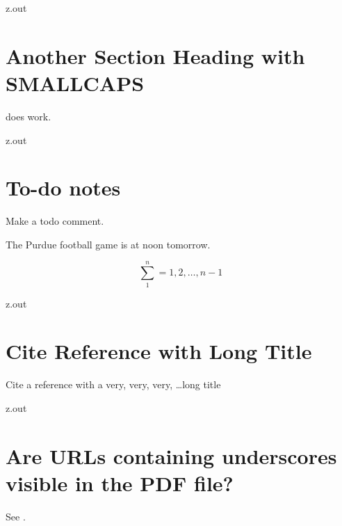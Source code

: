 \MyIO


\begin{VerbatimOut}{z.out}


\section
  [Another Section Heading with {\protect\scshape SmallCaps}]%
  {Another Section Heading with S{\protect\scriptsize MALL}C{\protect\scriptsize APS}}

does work.
\end{VerbatimOut}

\MyIO


\begin{VerbatimOut}{z.out}


\section{To-do notes}

Make a todo comment.%

The Purdue football game is at noon tomorrow.%

\[
  \sum_1^n = 1, 2, \ldots, n - 1
\]%
\end{VerbatimOut}

\MyIO


\begin{VerbatimOut}{z.out}


\section{Cite Reference with Long Title}
  
Cite a reference with a very, very, very, \ldots long title
\cite{test-long-title}
\end{VerbatimOut}

\MyIO


\begin{VerbatimOut}{z.out}

\section{Are URLs containing underscores visible in the PDF file?}

See \cite{wikipedia-feynman-diagram}.
\end{VerbatimOut}

\MyIO
